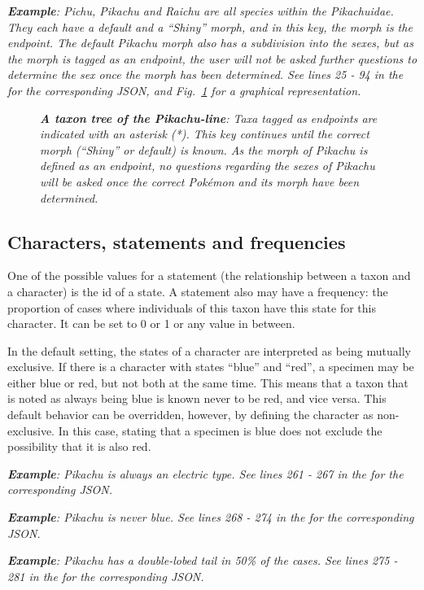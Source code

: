 \documentclass[10pt,letterpaper]{article}
\begin{document}
\textit{\textbf{Example}: Pichu, Pikachu and Raichu are all species within the Pikachuidae. They each have a default and a ``Shiny'' morph, and in this key, the morph is the endpoint. The default Pikachu morph also has a subdivision into the sexes, but as the morph is tagged as an endpoint, the user will not be asked further questions to determine the sex once the morph has been determined. See lines 25 - 94 in the  for the corresponding JSON, and Fig.~\ref{fig3} for a graphical representation.}


\begin{figure}[!h]
  \caption{\textit{\textbf{A taxon tree of the Pikachu-line}:
Taxa tagged as endpoints are indicated with an asterisk (*). This key continues until the correct morph (``Shiny'' or default) is known. As the morph of Pikachu is defined as an endpoint, no questions regarding the sexes of Pikachu will be asked once the correct Pokémon and its morph have been determined.
  }}
  \label{fig3}
\end{figure}
\subsection*{
Characters, statements and frequencies
}
One of the possible values for a statement (the relationship between a taxon and a character) is the id of a state. A statement also may have a frequency: the proportion of cases where individuals of this taxon have this state for this character. It can be set to 0 or 1 or any value in between.

In the default setting, the states of a character are interpreted as being mutually exclusive. If there is a character with states ``blue'' and ``red'', a specimen may be either blue or red, but not both at the same time. This means that a taxon that is noted as always being blue is known never to be red, and vice versa. This default behavior can be overridden, however, by defining the character as non-exclusive. In this case, stating that a specimen is blue does not exclude the possibility that it is also red.

\textit{\textbf{Example}: Pikachu is always an electric type. See lines 261 - 267 in the  for the corresponding JSON.}

\textit{\textbf{Example}: Pikachu is never blue. See lines 268 - 274 in the  for the corresponding JSON.}

\textit{\textbf{Example}: Pikachu has a double-lobed tail in 50\% of the cases. See lines 275 - 281 in the  for the corresponding JSON.}
\end{document}
